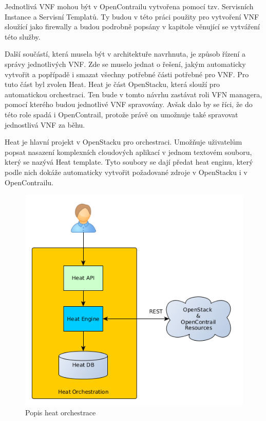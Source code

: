 Jednotlivá VNF mohou být v OpenContrailu vytvořena pomocí tzv. Servisních Instance a Servisní Templatů. Ty budou v této práci použity pro vytvoření VNF sloužící jako firewally a budou podrobně popsány v kapitole věnující se vytváření této služby.

Další součástí, která musela být v architektuře navrhnuta, je způsob řízení a správy jednotlivých VNF. Zde se muselo jednat o řešení, jakým automaticky vytvořit a popřípadě i smazat všechny potřebné části potřebné pro VNF. Pro tuto část byl zvolen Heat. Heat je část OpenStacku, která slouží pro automatickou orchestraci. Ten bude v tomto návrhu zastávat roli VFN managera, pomocí kterého budou jednotlivé VNF spravovány. Avšak dalo by se říci, že do této role spadá i OpenContrail, protože právě on umožnuje také spravovat jednostlivá VNF za běhu.  

Heat je hlavní projekt v OpenStacku pro orchestraci. Umožňuje uživatelům popsat nasazení komplexních cloudových aplikací v jednom textovém souboru, který se nazývá Heat template. Tyto soubory se dají předat heat enginu, který podle nich dokáže automaticky vytvořit požadované zdroje v OpenStacku i v OpenContrailu. 

\begin{figure}[h]
\begin{centering}
\includegraphics[scale=0.41]{images/heat_engine}
\par\end{centering}
\caption{Popis heat orchestrace\label{fig:heat_engine}}
\end{figure}

